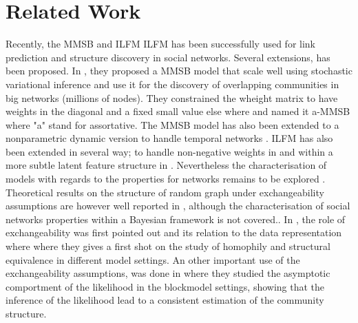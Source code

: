 \section{Related Work}



Recently, the MMSB \cite{MMSB} and ILFM {ILFM} has been successfully used for link prediction and structure discovery in social networks. Several extensions, has been proposed. In \cite{AMMSB}, they proposed a MMSB model that scale well using stochastic variational inference and use it for the discovery of overlapping communities in big networks (millions of nodes). They constrained the wheight matrix  to have weights in the diagonal and a fixed small value else where and named it a-MMSB where "a" stand for assortative. The MMSB model has also been extended to a nonparametric dynamic version to handle temporal networks \cite{fan2015dynamic}. ILFM has also been extended in several way; to handle non-negative weights in \cite{IMRM} and within a more subtle latent feature structure in \cite{ILAM}. Nevertheless the characterisation of models with regards to the properties for networks remains to be explored \cite{jacobs2014unified}. Theoretical results on the structure of random graph under exchangeability assumptions are however well reported in \cite{orbanz2015bayesian}, although the characterisation of social networks properties within a Bayesian framework is not covered.. In \cite{hoff2008modeling}, the role of exchangeability was first pointed out and its relation to the data representation where  where they gives a first shot on the study of homophily and structural equivalence in different model settings. An other important use of the exchangeability assumptions, was done in \cite{bickel2009nonparametric} where they studied the asymptotic comportment of the likelihood in the blockmodel settings, showing that the inference of the likelihood lead to a consistent estimation of the community structure.

